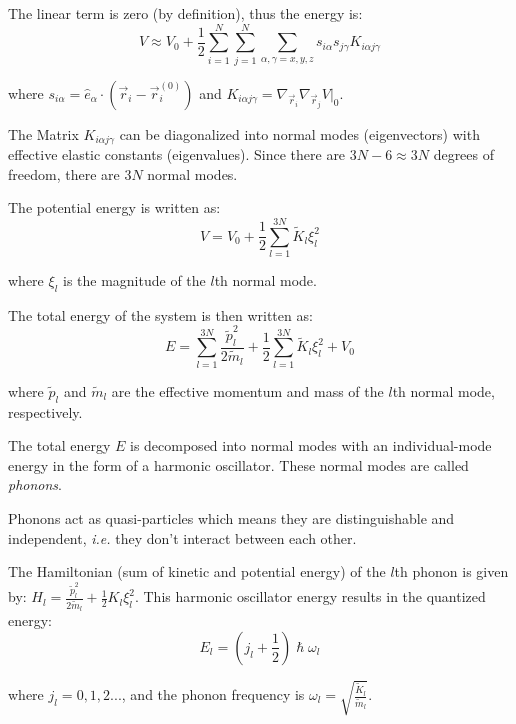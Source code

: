 \documentclass[book.tex]{subfiles}
\begin{document}
The linear term is zero (by definition), thus the energy is:
\begin{equation}\label{Eq17}
V \approx V_0 + \frac{1}{2} \sum_{i=1}^N \sum_{j=1}^N \sum_{\alpha,\gamma = x,y,z} s_{i\alpha}s_{j\gamma}K_{i\alpha j \gamma}
\end{equation}

\noindent where $s_{i\alpha} = \hat{e}_\alpha \cdot \left(\vec{r}_i - \vec{r}^{(0)}_i \right)$ and $K_{i\alpha j \gamma} = \nabla_{\vec{r}_i} \nabla_{\vec{r}_j} V|_0$.

The Matrix $K_{i\alpha j \gamma}$ can be diagonalized into normal modes (eigenvectors) with effective elastic constants (eigenvalues). Since there are $3N-6\approx 3N$ degrees of freedom, there are $3N$ normal modes.

The potential energy is written as:
\begin{equation}\label{Eq18}
V = V_0 + \frac{1}{2}\sum_{l=1}^{3N} \tilde{K}_l \xi_l^2
\end{equation}

\noindent where $\xi_l$ is the magnitude of the $l$th normal mode.

The total energy of the system is then written as:
\begin{equation}\label{Eq19}
E = \sum_{l=1}^{3N}\frac{\tilde{p}_l^2}{2\tilde{m}_l} + \frac{1}{2}\sum_{l=1}^{3N}\tilde{K}_l \xi_l^2 + V_0
\end{equation}

\noindent where $\tilde{p}_l$ and $\tilde{m}_l$ are the effective momentum and mass of the $l$th normal mode, respectively.

The total energy $E$ is decomposed into normal modes with an individual-mode energy in the form of a harmonic oscillator. These normal modes are called \textit{phonons}.

Phonons act as quasi-particles which means they are distinguishable and independent, \textit{i.e.} they don't interact between each other.

The Hamiltonian (sum of kinetic and potential energy) of the $l$th
phonon is given by: $H_l = \frac{\tilde{p}_l^2}{2\tilde{m}_l} + \frac{1}{2}K_l\xi^2_l$. This harmonic oscillator energy results in the quantized energy:
\begin{equation}\label{Eq20}
E_l = \left(j_l + \frac{1}{2}\right)\hslash\omega_l
\end{equation}

\noindent where $j_l = 0,1,2...$, and the phonon frequency is $\omega_l = \sqrt{\frac{\tilde{K}_l}{\tilde{m}_l}}$.
\end{document}
